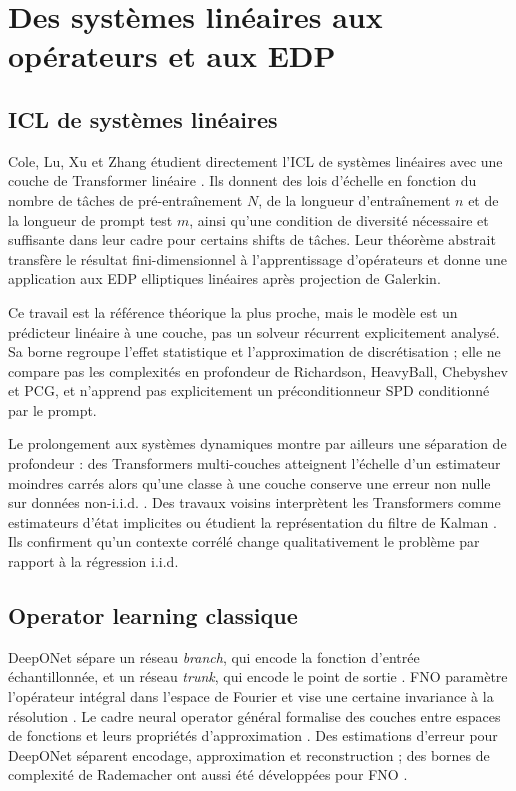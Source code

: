 \documentclass[11pt,a4paper]{article}
\begin{document}
\section{Des systèmes linéaires aux opérateurs et aux EDP}

\subsection{ICL de systèmes linéaires}

Cole, Lu, Xu et Zhang étudient directement l'ICL de systèmes linéaires avec
une couche de Transformer linéaire \cite{cole2025systems}. Ils donnent des lois
d'échelle en fonction du nombre de tâches de pré-entraînement $N$, de la
longueur d'entraînement $n$ et de la longueur de prompt test $m$, ainsi qu'une
condition de diversité nécessaire et suffisante dans leur cadre pour certains
shifts de tâches. Leur théorème abstrait transfère le résultat fini-dimensionnel
à l'apprentissage d'opérateurs et donne une application aux EDP elliptiques
linéaires après projection de Galerkin.

Ce travail est la référence théorique la plus proche, mais le modèle est un
prédicteur linéaire à une couche, pas un solveur récurrent explicitement
analysé. Sa borne regroupe l'effet statistique et l'approximation de
discrétisation ; elle ne compare pas les complexités en profondeur de
Richardson, HeavyBall, Chebyshev et PCG, et n'apprend pas explicitement un
préconditionneur SPD conditionné par le prompt.

Le prolongement aux systèmes dynamiques montre par ailleurs une séparation de
profondeur : des Transformers multi-couches atteignent l'échelle d'un
estimateur moindres carrés alors qu'une classe à une couche conserve une erreur
non nulle sur données non-i.i.d. \cite{cole2025dynamics}. Des travaux voisins
interprètent les Transformers comme estimateurs d'état implicites ou étudient
la représentation du filtre de Kalman
\cite{goel2024kalman,akram2024state}. Ils confirment qu'un contexte corrélé
change qualitativement le problème par rapport à la régression i.i.d.

\subsection{Operator learning classique}

DeepONet sépare un réseau \emph{branch}, qui encode la fonction d'entrée
échantillonnée, et un réseau \emph{trunk}, qui encode le point de sortie
\cite{lu2021deeponet}. FNO paramètre l'opérateur intégral dans l'espace de
Fourier et vise une certaine invariance à la résolution
\cite{li2021fno}. Le cadre neural operator général formalise des couches entre
espaces de fonctions et leurs propriétés d'approximation
\cite{kovachki2023neuraloperator}. Des estimations d'erreur pour DeepONet
séparent encodage, approximation et reconstruction
\cite{lanthaler2022error}; des bornes de complexité de Rademacher ont aussi été
développées pour FNO \cite{kim2022rademacher}.
\end{document}
